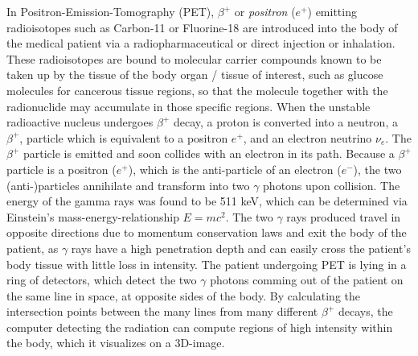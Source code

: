 In Positron-Emission-Tomography (PET), $\beta^+$ or \emph{positron} ($e^+$) emitting radioisotopes such as Carbon-11 or Fluorine-18 are introduced into the body of the medical patient via a radiopharmaceutical or direct injection or inhalation. These radioisotopes are bound to molecular carrier compounds known to be taken up by the tissue of the body organ / tissue of interest, such as glucose molecules for cancerous tissue regions, so that the molecule together with the radionuclide may accumulate in those specific regions. When the unstable radioactive nucleus undergoes $\beta^+$ decay, a proton is converted into a neutron, a $\beta^+$, particle which is equivalent to a positron $e^+$, and an electron neutrino $\nu_{e}$. The $\beta^+$ particle is emitted and soon collides with an electron in its path. Because a $\beta^+$ particle is a positron ($e^+$), which is the anti-particle of an electron ($e^-$), the two (anti-)particles annihilate and transform into two $\gamma$ photons upon collision. The energy of the gamma rays was found to be 511 keV, which can be determined via Einstein's mass-energy-relationship $E=mc^2$. The two $\gamma$ rays produced travel in opposite directions due to momentum conservation laws and exit the body of the patient, as $\gamma$ rays have a high penetration depth and can easily cross the patient's body tissue with little loss in intensity. The patient undergoing PET is lying in a ring of detectors, which detect the two $\gamma$ photons comming out of the patient on the same line in space, at opposite sides of the body. By calculating the intersection points between the many lines from many different $\beta^+$ decays, the computer detecting the radiation can compute regions of high intensity within the body, which it visualizes on a 3D-image.



